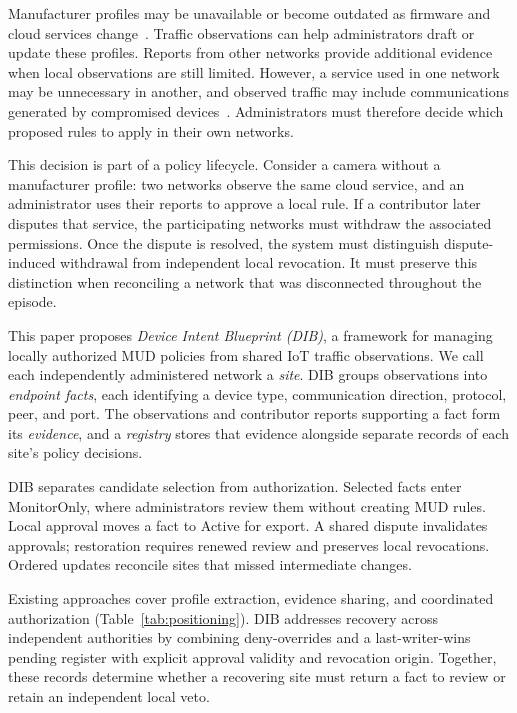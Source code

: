 \documentclass[journal]{IEEEtran}
\theoremstyle{definition}
\begin{document}
Manufacturer profiles may be unavailable or become outdated as firmware and cloud services change~\cite{hernandezramos2021mudreview,allowlistvariability}. Traffic observations can help administrators draft or update these profiles. Reports from other networks provide additional evidence when local observations are still limited. However, a service used in one network may be unnecessary in another, and observed traffic may include communications generated by compromised devices~\cite{allowlistvariability,mirai}. Administrators must therefore decide which proposed rules to apply in their own networks.

This decision is part of a policy lifecycle. Consider a camera without a manufacturer profile: two networks observe the same cloud service, and an administrator uses their reports to approve a local rule. If a contributor later disputes that service, the participating networks must withdraw the associated permissions. Once the dispute is resolved, the system must distinguish dispute-induced withdrawal from independent local revocation. It must preserve this distinction when reconciling a network that was disconnected throughout the episode.

This paper proposes \emph{Device Intent Blueprint (DIB)}, a framework for managing locally authorized MUD policies from shared IoT traffic observations. We call each independently administered network a \emph{site}. DIB groups observations into \emph{endpoint facts}, each identifying a device type, communication direction, protocol, peer, and port. The observations and contributor reports supporting a fact form its \emph{evidence}, and a \emph{registry} stores that evidence alongside separate records of each site's policy decisions.

DIB separates candidate selection from authorization. Selected facts enter MonitorOnly, where administrators review them without creating MUD rules. Local approval moves a fact to Active for export. A shared dispute invalidates approvals; restoration requires renewed review and preserves local revocations. Ordered updates reconcile sites that missed intermediate changes.


Existing approaches cover profile extraction, evidence sharing, and coordinated authorization (Table~\ref{tab:positioning}). DIB addresses recovery across independent authorities by combining deny-overrides and a last-writer-wins pending register with explicit approval validity and revocation origin. Together, these records determine whether a recovering site must return a fact to review or retain an independent local veto.
\end{document}
